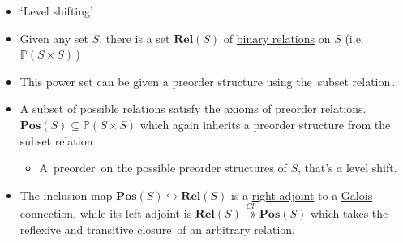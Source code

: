 
\begin{itemize}
    \item `Level shifting'
    \item Given any set $S$, there is a set $\mathbf{Rel}(S)$ of \href{doc/1 math/Seven Sketches in Compositionality/Chapter 1: Generative Effects/2 What is order/Relation}{binary relations} on $S$ (i.e. \,$\mathbb{P}(S \times S)$\,)
    \item This power set can be given a preorder structure using the \,subset relation\,.
    \item A subset of possible relations satisfy the axioms of preorder relations. $\mathbf{Pos}(S) \subseteq \mathbb{P}(S \times S)$ which again inherits a preorder structure from the subset relation
          \begin{itemize}
            \item A \,preorder\, on the possible preorder structures of $S$, that's a level shift.
          \end{itemize}
    \item The inclusion map $\mathbf{Pos}(S) \hookrightarrow \mathbf{Rel}(S)$ is a \href{doc/1 math/Seven Sketches in Compositionality/Chapter 1: Generative Effects/6 Galois connections/1 Definition and examples/Galois connection}{right adjoint} to a \href{doc/1 math/Seven Sketches in Compositionality/Chapter 1: Generative Effects/6 Galois connections/1 Definition and examples/Galois connection}{Galois connection}, while its \href{doc/1 math/Seven Sketches in Compositionality/Chapter 1: Generative Effects/6 Galois connections/1 Definition and examples/Galois connection}{left adjoint} is $\mathbf{Rel}(S)\overset{Cl}{\twoheadrightarrow} \mathbf{Pos}(S)$ which takes the \,reflexive and transitive closure\, of an arbitrary relation.
  \end{itemize}